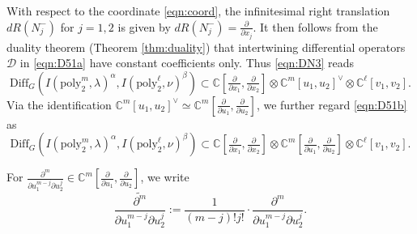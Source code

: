 \documentclass[reqno,11pt]{amsart}
\theoremstyle{remark}
\numberwithin{equation}{section}
\newcommand{\ga}{\alpha}
\newcommand{\C}{\mathbb{C}}
\newcommand{\Cal}{\mathcal}
\newcommand{\poly}{\mathrm{poly}}
\newcommand{\Diff}{\mathrm{Diff}}
\newcommand{\D}{\Cal{D}}
\begin{document}
With respect to the coordinate \eqref{eqn:coord},
the infinitesimal right translation $dR(N_j^-)$ for $j=1,2$ is given by
$dR(N_j^-) = \tfrac{\partial}{\partial x_j}$.
It then follows from the duality theorem
(Theorem \ref{thm:duality}) that 
 intertwining differential operators
 $\D$ in \eqref{eqn:D51a}
 have constant coefficients only. Thus \eqref{eqn:DN3} reads
\begin{equation}\label{eqn:D51b}
\Diff_G(I(\poly_2^m, \lambda)^\ga, I(\poly_2^\ell,  \nu)^\beta)
\subset
\C\left[\tfrac{\partial}{\partial x_1}, \tfrac{\partial}{\partial x_2}\right]
 \otimes \C^m[u_1, u_2]^\vee
 \otimes \C^\ell[v_1,v_2].
\end{equation}
Via the identification
$\C^m[u_1, u_2]^\vee 
\simeq \C^m[\tfrac{\partial}{\partial u_1}, \tfrac{\partial}{\partial u_2}]$,
we further regard \eqref{eqn:D51b} as
\begin{equation}
\Diff_G(I(\poly_2^m, \lambda)^\ga, I(\poly_2^\ell,  \nu)^\beta)
\subset
\C\left[\tfrac{\partial}{\partial x_1}, \tfrac{\partial}{\partial x_2}\right]
 \otimes \C^m\left[\tfrac{\partial}{\partial u_1}, \tfrac{\partial}{\partial u_2}\right]
 \otimes \C^\ell[v_1,v_2].\label{eqn:DC}
\end{equation}

For $ \frac{\partial^m}{\partial u_1^{m-j} \partial u_2^j} \in 
\C^m[\tfrac{\partial}{\partial u_1}, \tfrac{\partial}{\partial u_2}]$, we write
\begin{equation*}
\widetilde{\frac{\partial^m}{\partial u_1^{m-j} \partial u_2^j}}
:=\frac{1}{(m-j)!j!}\cdot \frac{\partial^m}{\partial u_1^{m-j} \partial u_2^j}.
\end{equation*}

\vskip 0.1in
\end{document}
